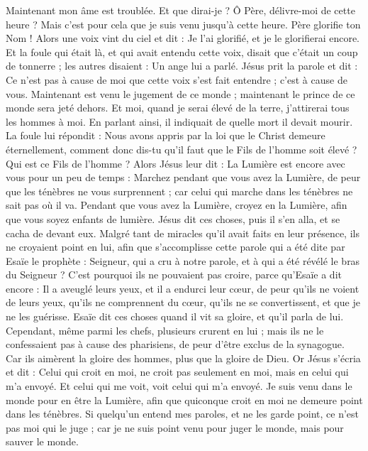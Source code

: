 \begin{multicols}{2}
Maintenant mon âme est troublée. Et que dirai-je ? Ô Père, délivre-moi de cette heure ? Mais c'est pour cela que je suis venu jusqu'à cette heure.
Père glorifie ton Nom ! Alors une voix vint du ciel et dit : Je l'ai glorifié, et je le glorifierai encore.
Et la foule qui était là, et qui avait entendu cette voix, disait que c'était un coup de tonnerre ; les autres disaient : Un ange lui a parlé.
Jésus prit la parole et dit : Ce n'est pas à cause de moi que cette voix s'est fait entendre ; c'est à cause de vous.
Maintenant est venu le jugement de ce monde ; maintenant le prince de ce monde sera jeté dehors.
Et moi, quand je serai élevé de la terre, j'attirerai tous les hommes à moi.
En parlant ainsi, il indiquait de quelle mort il devait mourir.
La foule lui répondit : Nous avons appris par la loi que le Christ demeure éternellement, comment donc dis-tu qu'il faut que le Fils de l'homme soit élevé ? Qui est ce Fils de l'homme ?
Alors Jésus leur dit : La Lumière est encore avec vous pour un peu de temps : Marchez pendant que vous avez la Lumière, de peur que les ténèbres ne vous surprennent ; car celui qui marche dans les ténèbres ne sait pas où il va.
Pendant que vous avez la Lumière, croyez en la Lumière, afin que vous soyez enfants de lumière. Jésus dit ces choses, puis il s'en alla, et se cacha de devant eux.
Malgré tant de miracles qu'il avait faits en leur présence, ils ne croyaient point en lui,
afin que s'accomplisse cette parole qui a été dite par Esaïe le prophète : Seigneur, qui a cru à notre parole, et à qui a été révélé le bras du Seigneur ?
C'est pourquoi ils ne pouvaient pas croire, parce qu'Esaïe a dit encore :
Il a aveuglé leurs yeux, et il a endurci leur cœur, de peur qu'ils ne voient de leurs yeux, qu'ils ne comprennent du cœur, qu'ils ne se convertissent, et que je ne les guérisse.
Esaïe dit ces choses quand il vit sa gloire, et qu'il parla de lui.
Cependant, même parmi les chefs, plusieurs crurent en lui ; mais ils ne le confessaient pas à cause des pharisiens, de peur d'être exclus de la synagogue.
Car ils aimèrent la gloire des hommes, plus que la gloire de Dieu.
Or Jésus s'écria et dit : Celui qui croit en moi, ne croit pas seulement en moi, mais en celui qui m'a envoyé.
Et celui qui me voit, voit celui qui m'a envoyé.
Je suis venu dans le monde pour en être la Lumière, afin que quiconque croit en moi ne demeure point dans les ténèbres.
Si quelqu'un entend mes paroles, et ne les garde point, ce n'est pas moi qui le juge ; car je ne suis point venu pour juger le monde, mais pour sauver le monde.

\end{multicols}
